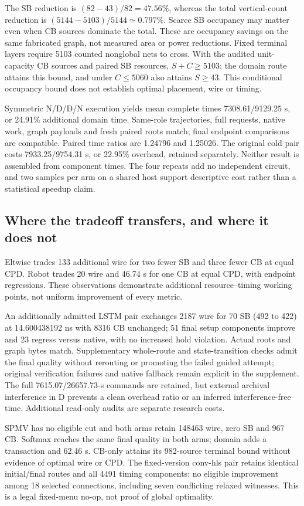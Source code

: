 \documentclass[conference,10pt]{IEEEtran}
\begin{document}
The SB reduction is $(82-43)/82=47.56\%$, whereas the total vertical-count reduction is $(5144-5103)/5144\simeq0.797\%$. Scarce SB occupancy may matter even when CB sources dominate the total. These are occupancy savings on the same fabricated graph, not measured area or power reductions. Fixed terminal layers require 5103 counted nonglobal nets to cross. With the audited unit-capacity CB sources and paired SB resources, $S+C\ge5103$; the domain route attains this bound, and under $C\le5060$ also attains $S\ge43$. This conditional occupancy bound does not establish optimal placement, wire or timing.

Symmetric N/D/D/N execution yields mean complete times 7308.61/9129.25 s, or 24.91\% additional domain time. Same-role trajectories, full requests, native work, graph payloads and fresh paired roots match; final endpoint comparisons are compatible. Paired time ratios are 1.24796 and 1.25026. The original cold pair costs 7933.25/9754.31 s, or 22.95\% overhead, retained separately. Neither result is assembled from component times. The four repeats add no independent circuit, and two samples per arm on a shared host support descriptive cost rather than a statistical speedup claim.

\subsection{Where the tradeoff transfers, and where it does not}
Eltwise trades 133 additional wire for two fewer SB and three fewer CB at equal CPD. Robot trades 20 wire and 46.74 s for one CB at equal CPD, with endpoint regressions. These observations demonstrate additional resource--timing working points, not uniform improvement of every metric.

An additionally admitted LSTM pair exchanges 2187 wire for 70 SB (492 to 422) at 14.600438192 ns with 8316 CB unchanged; 51 final setup components improve and 23 regress versus native, with no increased hold violation. Actual roots and graph bytes match. Supplementary whole-route and state-transition checks admit the final quality without rerouting or promoting the failed guided attempt; original verification failures and native fallback remain explicit in the supplement. The full 7615.07/26657.73-s commands are retained, but external archival interference in D prevents a clean overhead ratio or an inferred interference-free time. Additional read-only audits are separate research costs.

SPMV has no eligible cut and both arms retain 148463 wire, zero SB and 967 CB. Softmax reaches the same final quality in both arms; domain adds a transaction and 62.46 s. CB-only attains its 982-source terminal bound without evidence of optimal wire or CPD. The fixed-version conv-hls pair retains identical initial/final routes and all 4491 timing components: no eligible improvement among 18 selected connections, including seven conflicting relaxed witnesses. This is a legal fixed-menu no-op, not proof of global optimality.
\end{document}
